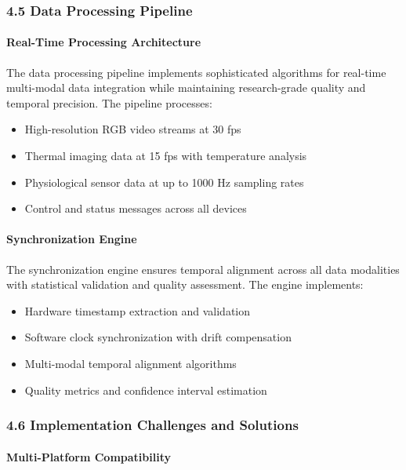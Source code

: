 \documentclass[12pt,a4paper]{report}
\begin{document}
\subsubsection{4.5 Data Processing Pipeline}

\paragraph{Real-Time Processing Architecture}

The data processing pipeline implements sophisticated algorithms for real-time multi-modal data integration while
maintaining research-grade quality and temporal precision. The pipeline processes:

\begin{itemize}
\item High-resolution RGB video streams at 30 fps
\item Thermal imaging data at 15 fps with temperature analysis
\item Physiological sensor data at up to 1000 Hz sampling rates
\item Control and status messages across all devices

\end{itemize}
\paragraph{Synchronization Engine}

The synchronization engine ensures temporal alignment across all data modalities with statistical validation and quality
assessment. The engine implements:

\begin{itemize}
\item Hardware timestamp extraction and validation
\item Software clock synchronization with drift compensation
\item Multi-modal temporal alignment algorithms
\item Quality metrics and confidence interval estimation

\end{itemize}
\subsubsection{4.6 Implementation Challenges and Solutions}

\paragraph{Multi-Platform Compatibility}
\end{document}
